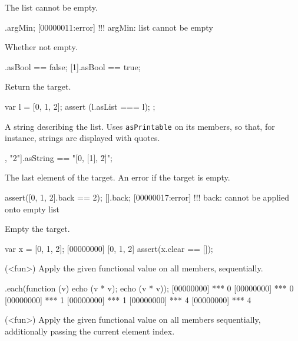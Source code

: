 \begin{urbiscriptapi}
The list cannot be empty.

\begin{urbiscript}
[].argMin;
[00000011:error] !!! argMin: list cannot be empty
\end{urbiscript}

\item[asBool]
  Whether not empty.
\begin{urbiassert}
[].asBool == false;
[1].asBool == true;
\end{urbiassert}

\item[asList]
  Return the target.

\begin{urbiscript}
{
  var l = [0, 1, 2];
  assert (l.asList === l);
};
\end{urbiscript}

\item[asString]
  A string describing the list.  Uses \lstinline|asPrintable| on its
  members, so that, for instance, strings are displayed with quotes.

\begin{urbiassert}
[0, [1], "2"].asString == "[0, [1], \"2\"]";
\end{urbiassert}

\item[back]
  The last element of the target. An error if the target is empty.

\begin{urbiscript}
assert([0, 1, 2].back == 2);
[].back;
[00000017:error] !!! back: cannot be applied onto empty list
\end{urbiscript}

\item[clear]
  Empty the target.

\begin{urbiscript}
var x = [0, 1, 2];
[00000000] [0, 1, 2]
assert(x.clear == []);
\end{urbiscript}

\item[each](<fun>)%
  Apply the given functional value  on all members,
  sequentially.

\begin{urbiscript}
[0, 1, 2].each(function (v) {echo (v * v); echo (v * v)});
[00000000] *** 0
[00000000] *** 0
[00000000] *** 1
[00000000] *** 1
[00000000] *** 4
[00000000] *** 4
\end{urbiscript}

\item[eachi](<fun>)%
  Apply the given functional value  on all members
  sequentially, additionally passing the current element index.


\end{urbiscriptapi}
